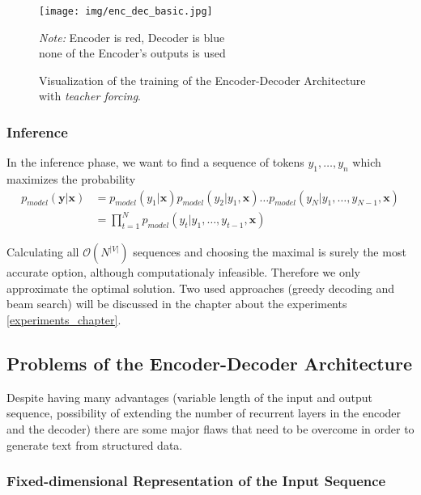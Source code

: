 \begin{figure}[!h]
    \centering
    \texttt{[image: img/enc\_dec\_basic.jpg]}

    \footnotesize{\textit{Note:} Encoder is red, Decoder is blue \\ }
    \footnotesize{none of the Encoder's outputs is used}
    \caption{\centering Visualization of the training of the Encoder-Decoder Architecture with \emph{teacher forcing}.} \label{enc_dec_visualization}
\end{figure}

\subsubsection{Inference}

In the inference phase, we want to find a sequence of tokens $y_1,\dots,y_n$ which maximizes the probability
\begin{align}
    p_{model}(\boldsymbol{y} | \boldsymbol{x}) &= p_{model}(y_1|\boldsymbol{x})p_{model}(y_2|y_1, \boldsymbol{x})\dots p_{model}(y_N|y_1,\dots,y_{N-1}, \boldsymbol{x})\\
    &= \prod_{t=1}^N{p_{model}(y_t|y_1,\dots,y_{t-1}, \boldsymbol{x})}
\end{align}

Calculating all $\mathcal{O}(N^{|V|})$ sequences and choosing the maximal is surely the most accurate option, although computationaly infeasible. Therefore we only approximate the optimal solution. Two used approaches (greedy decoding and beam search) will be discussed in the chapter about the experiments \ref{experiments_chapter}.


\subsection{Problems of the Encoder-Decoder Architecture}

Despite having many advantages (variable length of the input and output sequence, possibility of extending the number of recurrent layers in the encoder and the decoder) there are some major flaws that need to be overcome in order to generate text from structured data.

\subsubsection{Fixed-dimensional Representation of the Input Sequence} \label{fixed_repre_problem}

